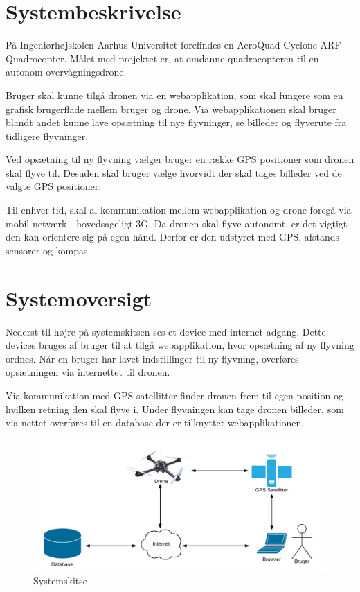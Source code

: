 \section{Systembeskrivelse}
På Ingeniørhøjskolen Aarhus Universitet forefindes en AeroQuad Cyclone ARF Quadrocopter. 
Målet med projektet er, at omdanne quadrocopteren til en autonom overvågningsdrone.

Bruger skal kunne tilgå dronen via en webapplikation, som skal fungere som en grafisk brugerflade mellem bruger og drone. Via webapplikationen skal bruger blandt andet kunne lave opsætning til nye flyvninger, se billeder og flyverute fra tidligere flyvninger. 

Ved opsætning til ny flyvning vælger bruger en række GPS positioner som dronen skal flyve til. Desuden skal bruger vælge hvorvidt der skal tages billeder ved de valgte GPS positioner. 

Til enhver tid, skal al kommunikation mellem webapplikation og drone foregå via mobil netværk - hovedsageligt 3G. Da dronen skal flyve autonomt, er det vigtigt den kan orientere sig på egen hånd. Derfor er den udstyret med GPS, afstands sensorer og kompas.


\section{Systemoversigt}
Nederst til højre på systemskitsen ses et device med internet adgang. Dette devices bruges af bruger til at tilgå webapplikation, hvor opsætning af ny flyvning ordnes. Når en bruger har lavet indstillinger til ny flyvning, overføres opsætningen via internettet til dronen.
 
Via kommunikation med GPS satellitter finder dronen frem til egen position og hvilken retning den skal flyve i. Under flyvningen kan tage dronen billeder, som via nettet overføres til en database der er tilknyttet webapplikationen.

\vspace{-5pt}
\begin{figure}[H]
\centering
\includegraphics[width=1\textwidth]{Billeder/Projektbeskrivelse.png}
\vspace{-5pt}
\caption{Systemskitse}
\label{fig:Systemskitse}
\end{figure}